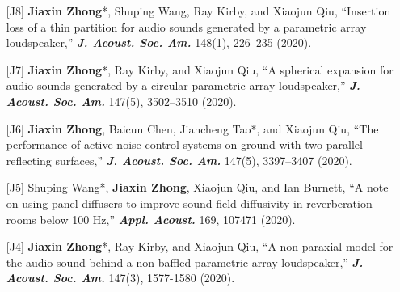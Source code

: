 \documentclass[10pt,a4paper,ragged2e,withhyper]{altacv}
\newcommand{\PubJournal}[1]{\textbf{\textit{#1}}}
\newcommand{\PubTitle}[1]{``{#1,}''}
\newcommand{\PubCorAuthor}[1]{#1*}
\begin{document}
\begin{itemize}[leftmargin = 30pt]
    \item[{[J8]}]
    \PubCorAuthor{\textbf{Jiaxin Zhong}}, Shuping Wang, Ray Kirby, and Xiaojun Qiu,
    \PubTitle{Insertion loss of a thin partition for audio sounds generated by a parametric array loudspeaker}
    \PubJournal{J. Acoust. Soc. Am.}
    148(1), 226--235 (2020).
    \href{https://doi.org/10.1121/10.0001568}{\color{accent}\aiDoi}
    \href{https://github.com/JiaxinZhong/JiaxinZhong.github.io/raw/master/publications/journal/Zhong2020-JASA-PAL_insertion_loss.pdf}{\color{accent}\faFilePdf[regular]}

    \item[{[J7]}]
    \PubCorAuthor{\textbf{Jiaxin Zhong}}, Ray Kirby, and Xiaojun Qiu,
    \PubTitle{A spherical expansion for audio sounds generated by a circular parametric array loudspeaker}
    \PubJournal{J. Acoust. Soc. Am.}
    147(5), 3502--3510 (2020).
    \href{https://doi.org/10.1121/10.0001261}{\color{accent}\aiDoi}
    \href{https://github.com/JiaxinZhong/JiaxinZhong.github.io/raw/master/publications/journal/Zhong2020-JASA-PAL_SWE.pdf}{\color{accent}\faFilePdf[regular]}

    \item[{[J6]}] \textbf{Jiaxin Zhong}, Baicun Chen, \PubCorAuthor{Jiancheng Tao}, and Xiaojun Qiu,
    \PubTitle{The performance of active noise control systems on ground with two parallel reflecting surfaces}
    \PubJournal{J. Acoust. Soc. Am.}
    147(5), 3397--3407 (2020).
    \href{https://doi.org/10.1121/10.0001227}{\color{accent}\aiDoi}
    \href{https://github.com/JiaxinZhong/JiaxinZhong.github.io/raw/master/publications/journal/Zhong2020-JASA-ANC_parallel_surface.pdf}{\color{accent}\faFilePdf[regular]}

    \item[{[J5]}] \PubCorAuthor{Shuping Wang}, \textbf{Jiaxin Zhong}, Xiaojun Qiu, and Ian Burnett,
    \PubTitle{A note on using panel diffusers to improve sound field diffusivity in reverberation rooms below 100 Hz}
    \PubJournal{Appl. Acoust.}
    169, 107471 (2020).
    \href{https://doi.org/10.1016/j.apacoust.2020.107471}{\color{accent}\aiDoi}
    \href{https://github.com/JiaxinZhong/JiaxinZhong.github.io/raw/master/publications/journal/Wang2020-AA-Diffuser.pdf}{\color{accent}\faFilePdf[regular]}

    \item[{[J4]}] \PubCorAuthor{\textbf{Jiaxin Zhong}}, Ray Kirby, and Xiaojun Qiu,
    \PubTitle{A non-paraxial model for the audio sound behind a non-baffled parametric array loudspeaker}
    \PubJournal{J. Acoust. Soc. Am.}
    147(3), 1577-1580 (2020).
    \href{https://doi.org/10.1121/10.0000793}{\color{accent}\aiDoi}
    \href{https://github.com/JiaxinZhong/JiaxinZhong.github.io/raw/master/publications/journal/Zhong2020-JASA-PAL_disk.pdf}{\color{accent}\faFilePdf[regular]}


\end{itemize}
\end{document}
